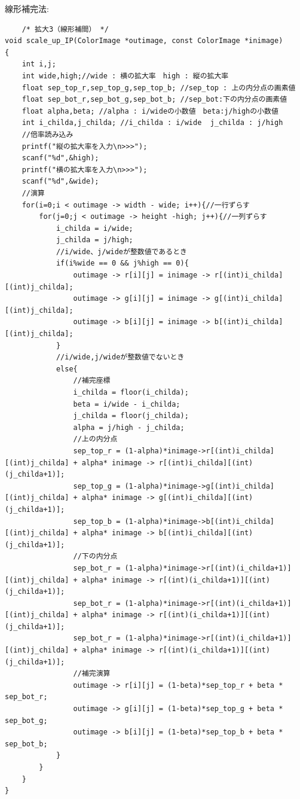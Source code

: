 \documentclass[a4paper,titlepage,11pt]{ltjsarticle}
\begin{document}
線形補完法:
\begin{lstlisting}
	/* 拡大3（線形補間） */
void scale_up_IP(ColorImage *outimage, const ColorImage *inimage)
{
	int i,j;
	int wide,high;//wide : 横の拡大率　high : 縦の拡大率
	float sep_top_r,sep_top_g,sep_top_b; //sep_top : 上の内分点の画素値
	float sep_bot_r,sep_bot_g,sep_bot_b; //sep_bot:下の内分点の画素値
	float alpha,beta; //alpha : i/wideの小数値　beta:j/highの小数値
	int i_childa,j_childa; //i_childa : i/wide  j_childa : j/high
	//倍率読み込み
	printf("縦の拡大率を入力\n>>>");
	scanf("%d",&high);
	printf("横の拡大率を入力\n>>>");
	scanf("%d",&wide);
	//演算
	for(i=0;i < outimage -> width - wide; i++){//一行ずらす
		for(j=0;j < outimage -> height -high; j++){//一列ずらす
			i_childa = i/wide;
			j_childa = j/high;
			//i/wide、j/wideが整数値であるとき
			if(i%wide == 0 && j%high == 0){
				outimage -> r[i][j] = inimage -> r[(int)i_childa][(int)j_childa];
				outimage -> g[i][j] = inimage -> g[(int)i_childa][(int)j_childa];
				outimage -> b[i][j] = inimage -> b[(int)i_childa][(int)j_childa];
			}
			//i/wide,j/wideが整数値でないとき
			else{
				//補完座標
				i_childa = floor(i_childa);
				beta = i/wide - i_childa;
				j_childa = floor(j_childa);
				alpha = j/high - j_childa;
				//上の内分点
				sep_top_r = (1-alpha)*inimage->r[(int)i_childa][(int)j_childa] + alpha* inimage -> r[(int)i_childa][(int)(j_childa+1)];
				sep_top_g = (1-alpha)*inimage->g[(int)i_childa][(int)j_childa] + alpha* inimage -> g[(int)i_childa][(int)(j_childa+1)];
				sep_top_b = (1-alpha)*inimage->b[(int)i_childa][(int)j_childa] + alpha* inimage -> b[(int)i_childa][(int)(j_childa+1)];
				//下の内分点
				sep_bot_r = (1-alpha)*inimage->r[(int)(i_childa+1)][(int)j_childa] + alpha* inimage -> r[(int)(i_childa+1)][(int)(j_childa+1)];
				sep_bot_r = (1-alpha)*inimage->r[(int)(i_childa+1)][(int)j_childa] + alpha* inimage -> r[(int)(i_childa+1)][(int)(j_childa+1)];
				sep_bot_r = (1-alpha)*inimage->r[(int)(i_childa+1)][(int)j_childa] + alpha* inimage -> r[(int)(i_childa+1)][(int)(j_childa+1)];
				//補完演算
				outimage -> r[i][j] = (1-beta)*sep_top_r + beta * sep_bot_r;
				outimage -> g[i][j] = (1-beta)*sep_top_g + beta * sep_bot_g;
				outimage -> b[i][j] = (1-beta)*sep_top_b + beta * sep_bot_b;
			}
		}
	}
}
\end{lstlisting}
\end{document}
